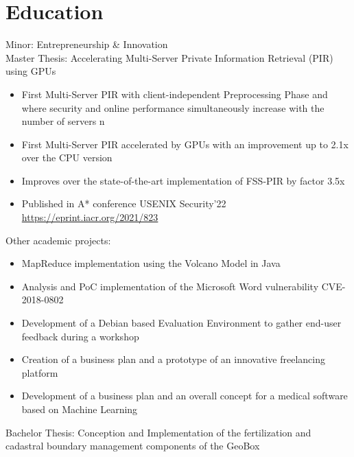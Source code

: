 \documentclass[12pt]{nice_cv}
\begin{document}
\cvheader

\section{Education}

Minor: Entrepreneurship \& Innovation \\
Master Thesis: Accelerating Multi-Server Private Information Retrieval (PIR) using GPUs
\begin{itemize}[topsep=2pt,itemsep=0pt,partopsep=0pt, parsep=2pt]
    \item{First Multi-Server PIR with client-independent Preprocessing Phase and where security and online performance simultaneously increase with the number of servers n}
    \item{First Multi-Server PIR accelerated by GPUs with an improvement up to 2.1x over the CPU version}
    \item{Improves over the state-of-the-art implementation of FSS-PIR by factor 3.5x}
    \item{Published in A* conference USENIX Security'22 \url{https://eprint.iacr.org/2021/823}}
\end{itemize}
Other academic projects:
\begin{itemize}[topsep=2pt,itemsep=0pt,partopsep=0pt, parsep=2pt]
	\item {MapReduce implementation using the Volcano Model in Java}
	\item {Analysis and PoC implementation of the Microsoft Word vulnerability CVE-2018-0802}
	\item {Development of a Debian based Evaluation Environment to gather end-user feedback during a workshop}
	\item {Creation of a business plan and a prototype of an innovative freelancing platform}
	\item {Development of a business plan and an overall concept for a medical software based on Machine Learning}
\end{itemize}
\separator


Bachelor Thesis: Conception and Implementation of the fertilization and cadastral boundary management components of the GeoBox\\~\\
\end{document}
